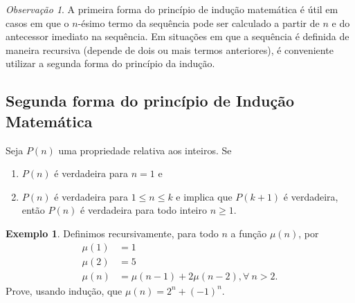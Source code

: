 \documentclass[]{book}
\providecommand{\tightlist}{%
  \setlength{\itemsep}{0pt}\setlength{\parskip}{0pt}}
\theoremstyle{definition}
\theoremstyle{definition}
\newtheorem{example}{Exemplo}[chapter]
\theoremstyle{definition}
\theoremstyle{remark}
\newtheorem*{remark}{Observação}
\begin{document}
\begin{remark}
\iffalse{} {Observação. } \fi{}A primeira forma do princípio de indução matemática é útil em casos em que o \(n\)-ésimo termo da sequência pode ser calculado a partir de \(n\) e do antecessor imediato na sequência.
Em situações em que a sequência é definida de maneira recursiva (depende de dois ou mais termos anteriores), é conveniente utilizar a segunda forma do princípio da indução.
\end{remark}

\hypertarget{segunda-forma-do-princuxedpio-de-induuxe7uxe3o-matemuxe1tica}{%
\subsection*{Segunda forma do princípio de Indução Matemática}\label{segunda-forma-do-princuxedpio-de-induuxe7uxe3o-matemuxe1tica}}

Seja \(P(n)\) uma propriedade relativa aos inteiros.
Se

\begin{enumerate}
\def\labelenumi{\roman{enumi}.}
\tightlist
\item
  \(P(n)\) é verdadeira para \(n=1\) e
\item
  \(P(n)\) é verdadeira para \(1\leq n \leq k\) e implica que \(P(k+1)\) é verdadeira, então \(P(n)\) é verdadeira para todo inteiro \(n \geq 1.\)
\end{enumerate}

\begin{example}
\protect\hypertarget{exm:unnamed-chunk-36}{}{\label{exm:unnamed-chunk-36} }Definimos recursivamente, para todo \(n\) a função \(\mu(n)\), por
\begin{align}
\mu(1) &= 1\\
\mu(2) &= 5\\
\mu(n) &= \mu(n-1) + 2\mu(n-2), \forall \ n>2.
\end{align}
Prove, usando indução, que \(\mu(n) = 2^n + (-1)^n.\)
\end{example}
\end{document}

